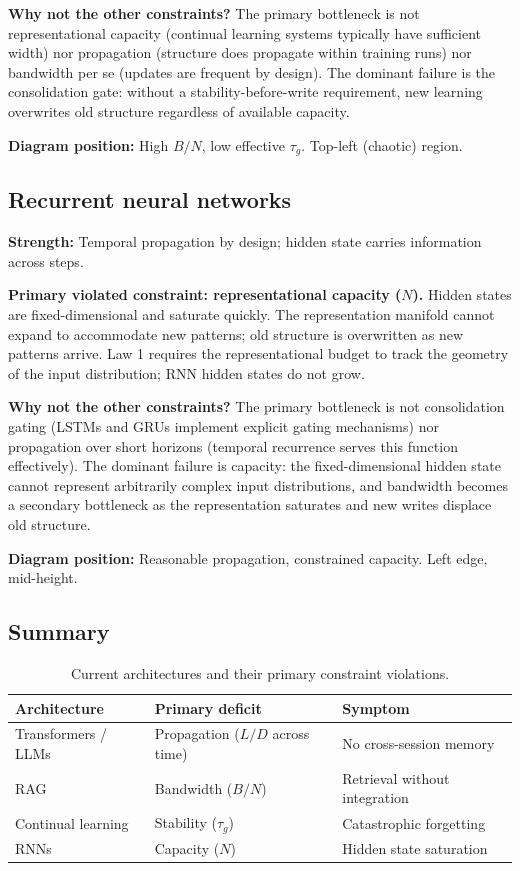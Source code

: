 \documentclass[12pt]{article}
\begin{document}
\textbf{Why not the other constraints?} The primary bottleneck is not representational capacity (continual learning systems typically have sufficient width) nor propagation (structure does propagate within training runs) nor bandwidth per se (updates are frequent by design). The dominant failure is the consolidation gate: without a stability-before-write requirement, new learning overwrites old structure regardless of available capacity.

\textbf{Diagram position:} High $B/N$, low effective $\tau_g$. Top-left (chaotic) region.

\subsection{Recurrent neural networks}

\textbf{Strength:} Temporal propagation by design; hidden state carries information across steps.

\textbf{Primary violated constraint: representational capacity ($N$).} Hidden states are fixed-dimensional and saturate quickly. The representation manifold cannot expand to accommodate new patterns; old structure is overwritten as new patterns arrive. Law 1 requires the representational budget to track the geometry of the input distribution; RNN hidden states do not grow.

\textbf{Why not the other constraints?} The primary bottleneck is not consolidation gating (LSTMs and GRUs implement explicit gating mechanisms) nor propagation over short horizons (temporal recurrence serves this function effectively). The dominant failure is capacity: the fixed-dimensional hidden state cannot represent arbitrarily complex input distributions, and bandwidth becomes a secondary bottleneck as the representation saturates and new writes displace old structure.

\textbf{Diagram position:} Reasonable propagation, constrained capacity. Left edge, mid-height.

\subsection{Summary}

\begin{table}[h]
\centering
\caption{Current architectures and their primary constraint violations.}
\label{tab:architectures}
\begin{tabular}{lll}
\toprule
\textbf{Architecture} & \textbf{Primary deficit} & \textbf{Symptom} \\
\midrule
Transformers / LLMs & Propagation ($L/D$ across time) & No cross-session memory \\
RAG & Bandwidth ($B/N$) & Retrieval without integration \\
Continual learning & Stability ($\tau_g$) & Catastrophic forgetting \\
RNNs & Capacity ($N$) & Hidden state saturation \\
\bottomrule
\end{tabular}
\end{table}
\end{document}
